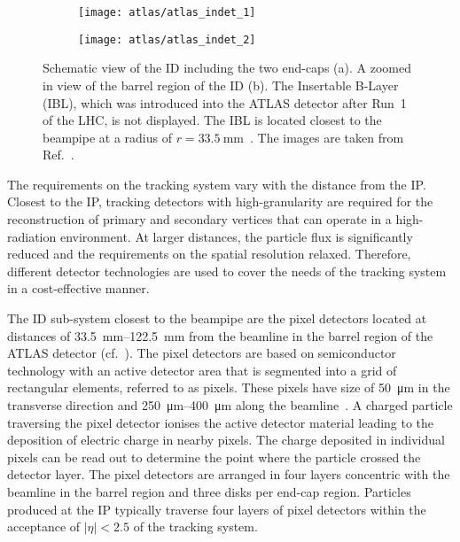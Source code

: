 \begin{figure}[htbp]

  \begin{subfigure}[b]{0.55\textwidth}
    \texttt{[image: atlas/atlas\_indet\_1]}%
    \subcaption{}
  \end{subfigure}\hfill%
  \begin{subfigure}[b]{0.45\textwidth}
    \texttt{[image: atlas/atlas\_indet\_2]}%
    \subcaption{}%
    \label{fig:indet_barrel}
  \end{subfigure}

  \caption{Schematic view of the ID including the two end-caps (a). A zoomed in
    view of the barrel region of the ID (b). The Insertable B-Layer (IBL), which
    was introduced into the ATLAS detector after Run~1 of the LHC, is not
    displayed. The IBL is located closest to the beampipe at a radius of
    $r = \SI{33.5}{\milli\metre}$~\cite{ATLAS-TDR-19,PIX-2018-001}. The images
    are taken from Ref.~\cite{PERF-2007-01}.}%
  \label{fig:atlas_inner_detector}
\end{figure}

The requirements on the tracking system vary with the distance from the IP.
Closest to the IP, tracking detectors with high-granularity are required for the
reconstruction of primary and secondary vertices that can operate in a
high-radiation environment. At larger distances, the particle flux is
significantly reduced and the requirements on the spatial resolution relaxed.
Therefore, different detector technologies are used to cover the needs of the
tracking system in a cost-effective manner.

The ID sub-system closest to the beampipe are the pixel detectors located at
distances of \SIrange{33.5}{122.5}{\milli\metre} from the beamline in the barrel
region of the ATLAS detector (cf.\ ). The pixel
detectors are based on semiconductor technology with an active detector area
that is segmented into a grid of rectangular elements, referred to as
pixels. These pixels have size of \SI{50}{\micro\metre} in the transverse
direction and \SIrange{250}{400}{\micro\metre} along the
beamline~\cite{PERF-2007-01,PIX-2018-001}. A charged particle traversing the
pixel detector ionises the active detector material leading to the deposition of
electric charge in nearby pixels. The charge deposited in individual pixels can
be read out to determine the point where the particle crossed the detector
layer. The pixel detectors are arranged in four layers concentric with the
beamline in the barrel region and three disks per end-cap region. Particles
produced at the IP typically traverse four layers of pixel detectors within the
acceptance of $|\eta| < 2.5$ of the tracking system.

